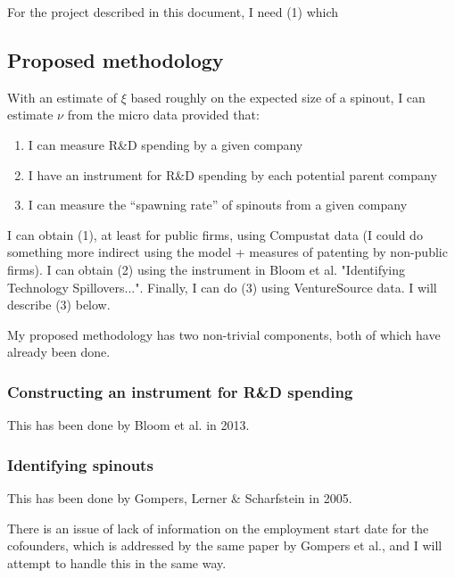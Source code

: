 \documentclass[12pt,english]{article}
\theoremstyle{remark}
\begin{document}
For the project described in this document, I need (1) which  





\subsection{Proposed methodology}

With an estimate of $\xi$ based roughly on the expected size of a spinout, I can estimate $\nu$ from the micro data provided that: 

\begin{enumerate}
	\item I can measure R\&D spending by a given company
	\item I have an instrument for R\&D spending by each potential parent company
	\item I can measure the ``spawning rate'' of spinouts from a given company
\end{enumerate}

I can obtain (1), at least for public firms, using Compustat data (I could do something more indirect using the model + measures of patenting by non-public firms). I can obtain (2) using the instrument in Bloom et al. "Identifying Technology Spillovers...". Finally, I can do (3) using VentureSource data. I will describe (3) below. 

My proposed methodology has two non-trivial components, both of which have already been done.

\subsubsection{Constructing an instrument for R\&D spending}

This has been done by Bloom et al. in 2013. 

\subsubsection{Identifying spinouts}

This has been done by Gompers, Lerner \& Scharfstein in 2005.

There is an issue of lack of information on the employment start date for the cofounders, which is addressed by the same paper by Gompers et al., and I will attempt to handle this in the same way. 
\end{document}
